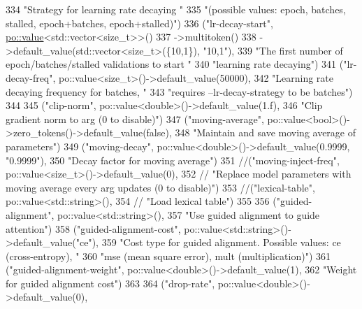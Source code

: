 \begin{DoxyCode}
334      \textcolor{stringliteral}{"Strategy for learning rate decaying "}
335      \textcolor{stringliteral}{"(possible values: epoch, batches, stalled, epoch+batches, epoch+stalled)"})
336     (\textcolor{stringliteral}{"lr-decay-start"}, \hyperlink{namespacemarian_1_1keywords_ac70de1b4c3cf6b7080cf5086f2963fd8}{po::value}<std::vector<size\_t>>()
337        ->multitoken()
338        ->default\_value(std::vector<size\_t>(\{10,1\}), \textcolor{stringliteral}{"10,1"}),
339        \textcolor{stringliteral}{"The first number of epoch/batches/stalled validations to start "}
340        \textcolor{stringliteral}{"learning rate decaying"})
341     (\textcolor{stringliteral}{"lr-decay-freq"}, po::value<size\_t>()->default\_value(50000),
342      \textcolor{stringliteral}{"Learning rate decaying frequency for batches, "}
343      \textcolor{stringliteral}{"requires --lr-decay-strategy to be batches"})
344 
345     (\textcolor{stringliteral}{"clip-norm"}, po::value<double>()->default\_value(1.f),
346      \textcolor{stringliteral}{"Clip gradient norm to  arg  (0 to disable)"})
347     (\textcolor{stringliteral}{"moving-average"}, po::value<bool>()->zero\_tokens()->default\_value(\textcolor{keyword}{false}),
348      \textcolor{stringliteral}{"Maintain and save moving average of parameters"})
349     (\textcolor{stringliteral}{"moving-decay"}, po::value<double>()->default\_value(0.9999, \textcolor{stringliteral}{"0.9999"}),
350      \textcolor{stringliteral}{"Decay factor for moving average"})
351     \textcolor{comment}{//("moving-inject-freq", po::value<size\_t>()->default\_value(0),}
352     \textcolor{comment}{// "Replace model parameters with moving average every  arg  updates (0 to disable)")}
353     \textcolor{comment}{//("lexical-table", po::value<std::string>(),}
354     \textcolor{comment}{// "Load lexical table")}
355 
356     (\textcolor{stringliteral}{"guided-alignment"}, po::value<std::string>(),
357      \textcolor{stringliteral}{"Use guided alignment to guide attention"})
358     (\textcolor{stringliteral}{"guided-alignment-cost"}, po::value<std::string>()->default\_value(\textcolor{stringliteral}{"ce"}),
359      \textcolor{stringliteral}{"Cost type for guided alignment. Possible values: ce (cross-entropy), "}
360      \textcolor{stringliteral}{"mse (mean square error), mult (multiplication)"})
361     (\textcolor{stringliteral}{"guided-alignment-weight"}, po::value<double>()->default\_value(1),
362      \textcolor{stringliteral}{"Weight for guided alignment cost"})
363 
364     (\textcolor{stringliteral}{"drop-rate"}, po::value<double>()->default\_value(0),

\end{DoxyCode}
